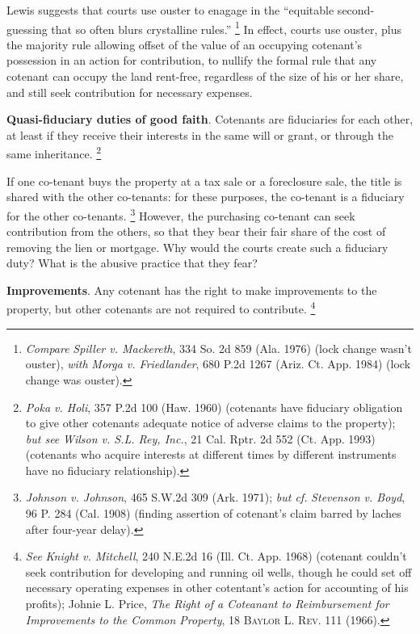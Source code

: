 Lewis suggests that courts use ouster to enagage in the ``equitable
second-guessing that so often blurs crystalline rules.''
\footnote{\emph{Compare} \emph{Spiller v. Mackereth}, 334 So. 2d 859 (Ala. 1976)
(lock change wasn't ouster), \emph{with} \emph{Morga v. Friedlander}, 680 P.2d
1267 (Ariz. Ct. App. 1984) (lock change was ouster).} In effect, courts use
ouster, plus the majority rule allowing offset of the value of an occupying
cotenant's possession in an action for contribution, to nullify the formal rule
that any cotenant can occupy the land rent-free, regardless of the size of his
or her share, and still seek contribution for necessary expenses.


\item \textbf{Quasi-fiduciary duties of good faith}. Cotenants are fiduciaries
for each other, at least if they receive their interests in the same will or
grant, or through the same inheritance. \footnote{\emph{Poka v. Holi}, 357 P.2d
100 (Haw. 1960) (cotenants have fiduciary obligation to give other cotenants
adequate notice of adverse claims to the property); \emph{but see} \emph{Wilson
v. S.L. Rey, Inc.}, 21 Cal. Rptr. 2d 552 (Ct. App. 1993) (cotenants who acquire
interests at different times by different instruments have no fiduciary
relationship).}


If one co-tenant buys the property at a tax sale or a foreclosure sale, the
title is shared with the other co-tenants: for these purposes, the co-tenant is
a fiduciary for the other co-tenants. \footnote{\emph{Johnson v. Johnson}, 465
S.W.2d 309 (Ark. 1971); \textit{but cf.} \emph{Stevenson v. Boyd}, 96 P. 284
(Cal. 1908) (finding assertion of cotenant's claim barred by laches after
four-year delay).} However, the purchasing co-tenant can seek contribution from
the others, so that they bear their fair share of the cost of removing the lien
or mortgage. Why would the courts create such a fiduciary duty? What is the
abusive practice that they fear?


\item \label{bkm:Ref305448174}\textbf{Improvements}. Any cotenant has the right
to make improvements to the property, but other cotenants are not required to
contribute. \footnote{\emph{See} \emph{Knight v. Mitchell}, 240 N.E.2d 16 (Ill.
Ct. App. 1968) (cotenant couldn't seek contribution for developing and running
oil wells, though he could set off necessary operating expenses in other
cotentant's action for accounting of his profits); Johnie L. Price, \textit{The
Right of a Coteanant to Reimbursement for Improvements to the Common Property},
18 \textsc{Baylor L. Rev}. 111 (1966).}

